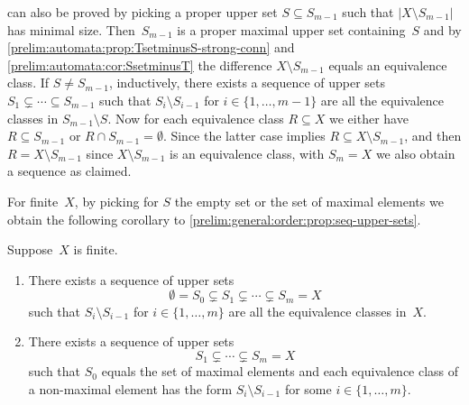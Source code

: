 \begin{remark}
	can also be proved 
	by picking a proper upper set $S \subseteq S_{m-1}$ such that $|X \setminus S_{m-1}|$ has minimal size.
	Then~$S_{m-1}$ is a proper maximal upper set containing~$S$
	and by \cref{prelim:automata:prop:TsetminusS-strong-conn} 
	and  \cref{prelim:automata:cor:SsetminusT}
	the difference $X \setminus S_{m-1}$ equals an equivalence class.
	If $S \ne S_{m-1}$, inductively, 
	there exists a sequence of upper sets $S_1 \subsetneq \cdots \subseteq S_{m-1}$
	such that $S_i \setminus S_{i-1}$ for $i \in \{1,\ldots,m-1\}$
	are all the equivalence classes in $S_{m-1} \setminus S$.
	Now for each equivalence class $R \subseteq X$
	we either have $R \subseteq S_{m-1}$
	or $R \cap S_{m-1} = \emptyset$. Since the latter case implies $R \subseteq X \setminus S_{m-1}$,
	and then $R = X \setminus S_{m-1}$ since $X \setminus S_{m-1}$
	is an equivalence class, with $S_m = X$
	we also obtain a sequence as claimed.
\end{remark}

For finite~$X$, by picking for $S$ the empty set
or the set of maximal elements we obtain the following corollary
to \cref{prelim:general:order:prop:seq-upper-sets}.

\begin{corollary} \label{prelim:general:order:cor:seq-upper-sets}
	Suppose~$X$ is finite.
	\begin{enumerate} 
		\item  \label{prelim:general:order:cor:seq-upper-sets:1} There exists a sequence of upper sets
		\[
		\emptyset = S_0 \subsetneq S_1 \subsetneq \cdots \subsetneq S_m = X
		\]
		such that $S_{i} \setminus S_{i-1}$ for $i \in \{1,\ldots,m\}$
		are all the equivalence classes in~$X$.
		
		\item  \label{prelim:general:order:cor:seq-upper-sets:2} There exists a sequence of upper sets
		\[
		S_1 \subsetneq \cdots \subsetneq S_m = X
		\]
		such that $S_0$ equals the set of maximal elements
		and each equivalence class of a non-maximal element has the form
		$S_{i} \setminus S_{i-1}$ for some $i \in \{1,\ldots,m\}$.
	\end{enumerate} 
\end{corollary}

